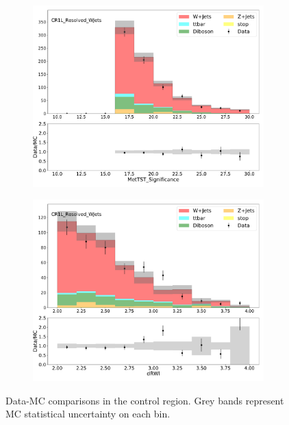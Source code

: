 \begin{figure}[htbp]
\begin{subfigure}{0.49\textwidth}
     \includegraphics[width = 0.98\textwidth]{Figures/4/datamc/CR1L_Resolved_WJets/MetTST_Significance.pdf}
     \caption{\metsig}
     \end{subfigure}
     \begin{subfigure}{0.49\textwidth}
     \includegraphics[width = 0.98\textwidth]{Figures/4/datamc/CR1L_Resolved_WJets/dRWl.pdf}
     \caption{\drWl}
     \end{subfigure}
     \caption{Data-MC comparisons in the \resolved \wjets control region. Grey bands represent MC statistical uncertainty on each bin.}
     \label{fig:Data_MC_CRdR_resolved}
  \end{figure}
